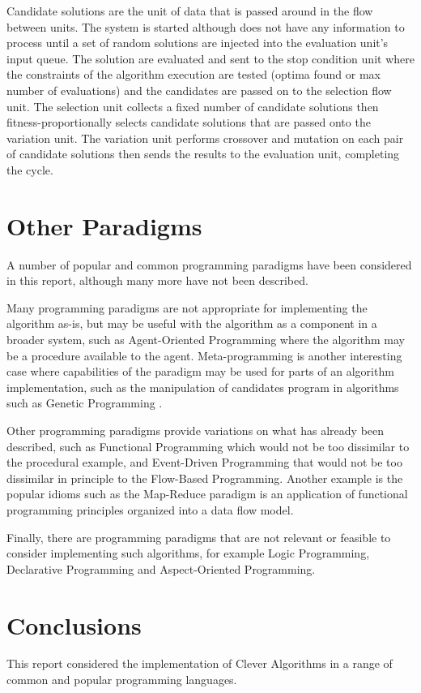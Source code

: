 \documentclass[a4paper, 11pt]{article}
\begin{document}
Candidate solutions are the unit of data that is passed around in the flow between units.
The system is started although does not have any information to process until a set of random solutions are injected into the evaluation unit's input queue. The solution are evaluated and sent to the stop condition unit where the constraints of the algorithm execution are tested (optima found or max number of evaluations) and the candidates are passed on to the selection flow unit. The selection unit collects a fixed number of candidate solutions then fitness-proportionally selects candidate solutions that are passed onto the variation unit. The variation unit performs crossover and mutation on each pair of candidate solutions then sends the results to the evaluation unit, completing the cycle.



% 
% 
\section{Other Paradigms}
\label{sec:other}
A number of popular and common programming paradigms have been considered in this report, although many more have not been described. 

Many programming paradigms are not appropriate for implementing the algorithm as-is, but may be useful with the algorithm as a component in a broader system, such as Agent-Oriented Programming where the algorithm may be a procedure available to the agent. Meta-programming is another interesting case where capabilities of the paradigm may be used for parts of an algorithm implementation, such as the manipulation of candidates program in algorithms such as Genetic Programming \cite{Brownlee2010q}.

Other programming paradigms provide variations on what has already been described, such as Functional Programming which would not be too dissimilar to the procedural example, and Event-Driven Programming that would not be too dissimilar in principle to the Flow-Based Programming. Another example is the popular idioms such as the Map-Reduce paradigm is an application of functional programming principles organized into a data flow model.

Finally, there are programming paradigms that are not relevant or feasible to consider implementing such algorithms, for example Logic Programming, Declarative Programming and Aspect-Oriented Programming.

\section{Conclusions}
\label{sec:conclusions}
This report considered the implementation of Clever Algorithms in a range of common and popular programming languages. 



\end{document}
